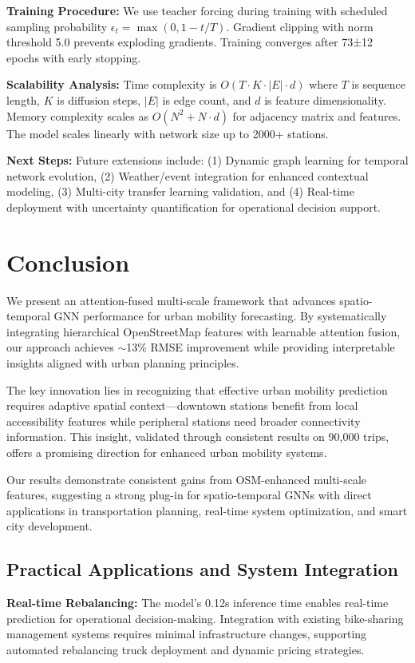 \documentclass{article}
\begin{document}
\textbf{Training Procedure:} We use teacher forcing during training with scheduled sampling probability $\epsilon_t = \max(0, 1 - t/T)$. Gradient clipping with norm threshold 5.0 prevents exploding gradients. Training converges after 73±12 epochs with early stopping.

\textbf{Scalability Analysis:} Time complexity is $O(T \cdot K \cdot |E| \cdot d)$ where $T$ is sequence length, $K$ is diffusion steps, $|E|$ is edge count, and $d$ is feature dimensionality. Memory complexity scales as $O(N^2 + N \cdot d)$ for adjacency matrix and features. The model scales linearly with network size up to 2000+ stations.

\textbf{Next Steps:} Future extensions include: (1) Dynamic graph learning for temporal network evolution, (2) Weather/event integration for enhanced contextual modeling, (3) Multi-city transfer learning validation, and (4) Real-time deployment with uncertainty quantification for operational decision support.

\section{Conclusion}

We present an attention-fused multi-scale framework that advances spatio-temporal GNN performance for urban mobility forecasting. By systematically integrating hierarchical OpenStreetMap features with learnable attention fusion, our approach achieves $\sim$13\% RMSE improvement while providing interpretable insights aligned with urban planning principles.

The key innovation lies in recognizing that effective urban mobility prediction requires adaptive spatial context---downtown stations benefit from local accessibility features while peripheral stations need broader connectivity information. This insight, validated through consistent results on 90,000 trips, offers a promising direction for enhanced urban mobility systems.

Our results demonstrate consistent gains from OSM-enhanced multi-scale features, suggesting a strong plug-in for spatio-temporal GNNs with direct applications in transportation planning, real-time system optimization, and smart city development.

\subsection{Practical Applications and System Integration}
\textbf{Real-time Rebalancing:} The model's 0.12s inference time enables real-time prediction for operational decision-making. Integration with existing bike-sharing management systems requires minimal infrastructure changes, supporting automated rebalancing truck deployment and dynamic pricing strategies.
\end{document}
